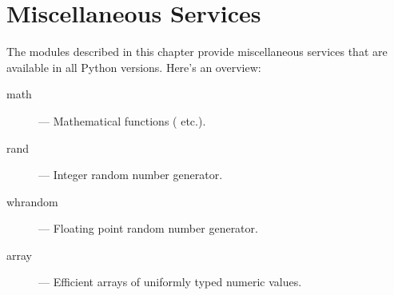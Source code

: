 \chapter{Miscellaneous Services}

The modules described in this chapter provide miscellaneous services
that are available in all Python versions.  Here's an overview:

\begin{description}

\item[math]
--- Mathematical functions ( etc.).

\item[rand]
--- Integer random number generator.

\item[whrandom]
--- Floating point random number generator.

\item[array]
--- Efficient arrays of uniformly typed numeric values.

\end{description}

